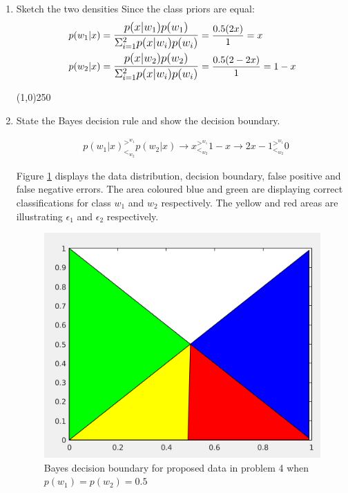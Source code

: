 \documentclass[12pt]{article}
\newcommand{\gl}{^{>^{w_1}}_{<_{w_2}}}
\begin{document}
\begin{enumerate}
\item Sketch the two densities
Since the class priors are equal:
\begin{align*}
&p(w_1 | x) = \mathlarger{\frac{p(x|w_1) p(w_1)}{\Sigma_{i=1}^2p(x|w_i) p(w_i)}} = \frac{0.5(2x)}{1} = x\\
&p(w_2 | x) = \mathlarger{\frac{p(x|w_2) p(w_2)}{\Sigma_{i=1}^2p(x|w_i) p(w_i)}} = \frac{0.5(2 - 2x)}{1} = 1 - x\\
\end{align*}

\begin{center}
\line(1,0){250}
\end{center}

\item State the Bayes decision rule and show the decision boundary.

\begin{align*}
&p(w_1|x)\gl p(w_2|x) \rightarrow x\gl 1-x \rightarrow 2x - 1\gl 0
\end{align*}

Figure \ref{fig:4-1} displays the data distribution, decision boundary, false positive and false negative errors. The area coloured blue and green are displaying correct classifications for class $w_1$ and $w_2$ respectively. The yellow and red areas are illustrating $\epsilon_1$ and $\epsilon_2$ respectively.

\begin{figure}[h]
\centering
\includegraphics[scale=0.4]{Imgs/4-1.png}
\caption{Bayes decision boundary for proposed data in problem 4 when $p(w_1) = p(w_2) = 0.5$}
\label{fig:4-1}
\end{figure}




\end{enumerate}
\end{document}
